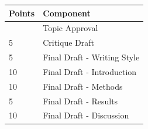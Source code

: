 \documentclass[
  12pt,
  letterpaper,
]{scrartcl}
\begin{document}
\begin{longtable}[]{@{}ll@{}}
\toprule\noalign{}
Points & Component \\
\midrule\noalign{}
\endhead
\bottomrule\noalign{}
\endlastfoot
5 & Topic Approval \\
5 & Critique Draft \\
5 & Final Draft - Writing Style \\
10 & Final Draft - Introduction \\
10 & Final Draft - Methods \\
5 & Final Draft - Results \\
10 & Final Draft - Discussion \\
\end{longtable}
\end{document}
